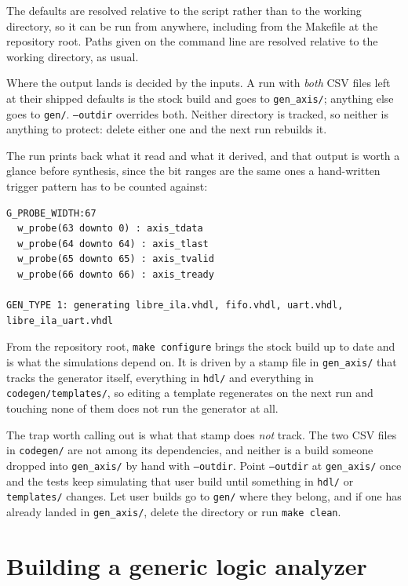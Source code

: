 \documentclass[../manual.tex]{subfiles}
\begin{document}
The defaults are resolved relative to the script rather than to the working directory, so it can be run from anywhere, including from the Makefile at the repository root. Paths given on the command line are resolved relative to the working directory, as usual.

Where the output lands is decided by the inputs. A run with \emph{both} CSV files left at their shipped defaults is the stock build and goes to \texttt{gen\_axis/}; anything else goes to \texttt{gen/}. \texttt{--outdir} overrides both. Neither directory is tracked, so neither is anything to protect: delete either one and the next run rebuilds it.

The run prints back what it read and what it derived, and that output is worth a glance before synthesis, since the bit ranges are the same ones a hand-written trigger pattern has to be counted against:

\begin{lstlisting}
G_PROBE_WIDTH:67
  w_probe(63 downto 0) : axis_tdata
  w_probe(64 downto 64) : axis_tlast
  w_probe(65 downto 65) : axis_tvalid
  w_probe(66 downto 66) : axis_tready

GEN_TYPE 1: generating libre_ila.vhdl, fifo.vhdl, uart.vhdl, libre_ila_uart.vhdl
\end{lstlisting}

From the repository root, \texttt{make configure} brings the stock build up to date and is what the simulations depend on. It is driven by a stamp file in \texttt{gen\_axis/} that tracks the generator itself, everything in \texttt{hdl/} and everything in \texttt{codegen/templates/}, so editing a template regenerates on the next run and touching none of them does not run the generator at all.

The trap worth calling out is what that stamp does \emph{not} track. The two CSV files in \texttt{codegen/} are not among its dependencies, and neither is a build someone dropped into \texttt{gen\_axis/} by hand with \texttt{--outdir}. Point \texttt{--outdir} at \texttt{gen\_axis/} once and the tests keep simulating that user build until something in \texttt{hdl/} or \texttt{templates/} changes. Let user builds go to \texttt{gen/} where they belong, and if one has already landed in \texttt{gen\_axis/}, delete the directory or run \texttt{make clean}.

\section{Building a generic logic analyzer}
\label{sec:codegen_generic}
\end{document}
